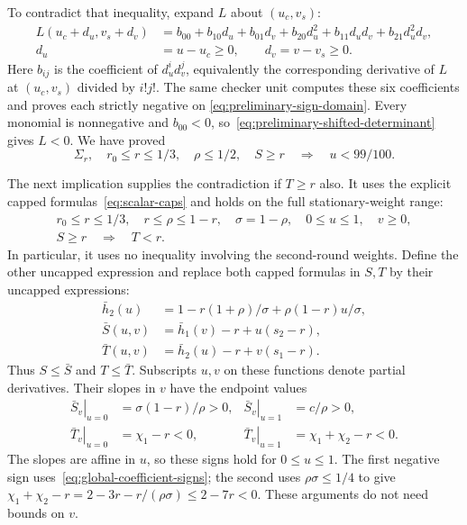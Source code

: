\documentclass[11pt]{article}
\theoremstyle{remark}
\theoremstyle{plain}
\begin{document}
To contradict that inequality, expand $L$ about $(u_c,v_s)$:
\begin{equation}
 \begin{aligned}
 L(u_c+d_u,v_s+d_v)
  &=b_{00}+b_{10}d_u+b_{01}d_v+b_{20}d_u^2
                +b_{11}d_ud_v+b_{21}d_u^2d_v,\\
 d_u&=u-u_c\ge0,\qquad d_v=v-v_s\ge0.
 \end{aligned}
 \label{eq:preliminary-shifted-determinant}
\end{equation}
Here $b_{ij}$ is the coefficient of $d_u^id_v^j$, equivalently the
corresponding derivative of $L$ at $(u_c,v_s)$ divided by $i!j!$.
The same checker unit computes these six coefficients
and proves each strictly negative on
\eqref{eq:preliminary-sign-domain}. Every monomial is nonnegative
and $b_{00}<0$, so~\eqref{eq:preliminary-shifted-determinant}
gives $L<0$. We have proved
\begin{equation}
 \Sigma_r,\quad r_0\le r\le1/3,\quad\rho\le1/2,\quad S\ge r
 \quad\Longrightarrow\quad u<99/100.
 \label{eq:preliminary-u-cap}
\end{equation}

The next implication supplies the contradiction if $T\ge r$ also.
It uses the explicit capped formulas~\eqref{eq:scalar-caps} and
holds on the full stationary-weight range:
\begin{equation}
 \begin{gathered}
 r_0\le r\le1/3,\quad r\le\rho\le1-r,\quad
 \sigma=1-\rho,\quad 0\le u\le1,\quad v\ge0,\\
 S\ge r\quad\Longrightarrow\quad T<r.
 \end{gathered}
 \label{eq:full-cap-exclusion}
\end{equation}
In particular, it uses no inequality involving the second-round weights.
Define the other uncapped expression and replace both capped
formulas in $S,T$ by their uncapped expressions:
\begin{equation}
 \begin{aligned}
 \bar h_2(u)&=1-r(1+\rho)/\sigma+\rho(1-r)u/\sigma,\\
 \bar S(u,v)&=\bar h_1(v)-r+u(s_2-r),\\
 \bar T(u,v)&=\bar h_2(u)-r+v(s_1-r).
 \end{aligned}
 \label{eq:uncapped-common-bounds}
\end{equation}
Thus $S\le\bar S$ and $T\le\bar T$. Subscripts $u,v$ on these
functions denote partial derivatives. Their slopes in $v$ have
the endpoint values
\begin{equation}
 \begin{aligned}
 \left.\bar S_v\right|_{u=0}&=\sigma(1-r)/\rho>0,&
 \left.\bar S_v\right|_{u=1}&=c/\rho>0,\\
 \left.\bar T_v\right|_{u=0}&=\chi_1-r<0,&
 \left.\bar T_v\right|_{u=1}&=\chi_1+\chi_2-r<0.
 \end{aligned}
 \label{eq:raw-cap-slopes}
\end{equation}
The slopes are affine in $u$, so these signs hold for $0\le u\le1$.
The first negative sign uses~\eqref{eq:global-coefficient-signs};
the second uses $\rho\sigma\le1/4$ to give
$\chi_1+\chi_2-r=2-3r-r/(\rho\sigma)\le2-7r<0$.
These arguments do not need bounds on $v$.
\end{document}
